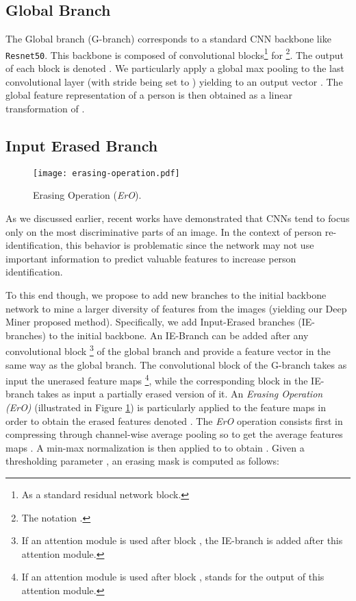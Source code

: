 \documentclass[final]{cvpr}
\begin{document}
\subsection{Global Branch}
The Global branch (G-branch) corresponds to a standard CNN backbone like \texttt{Resnet50}. This backbone is composed of  convolutional blocks\footnote{As a standard residual network block.}  for \footnote{The notation .}. The output of each block is denoted . We particularly apply a global max pooling to the last convolutional layer (with stride being set to ) yielding to an output vector . The global feature representation of a person is then obtained as a linear transformation of .


\subsection{Input Erased Branch}
\label{ss:ie_branch}
\begin{figure}[t!]
  \centering
  \texttt{[image: erasing-operation.pdf]}
\caption{Erasing Operation (\textit{ErO}).}
\label{fig:seo}
\end{figure}
As we discussed earlier, recent works \cite{chen2019hybrid, chen2019energy,tamaazousti2019universal} have  demonstrated that CNNs tend to focus only on the most discriminative parts of an image. In the context of person re-identification, this behavior is problematic since the network may not use important information to predict valuable features to increase person identification. 

To this end though, we propose to add new branches to the initial backbone network to mine a larger diversity of features from the images (yielding our Deep Miner proposed method). Specifically, we add Input-Erased branches (IE-branches) to the initial backbone. An IE-Branch can be added after any convolutional block \footnote{If an attention module is used after block , the IE-branch is added after this attention module.} of the global branch and provide a feature vector in the same way as the global branch. The convolutional block  of the G-branch takes as input the unerased feature maps \footnote{If an attention module is used after block ,  stands for the output of this attention module.}, while the corresponding block in the IE-branch takes as input a partially erased version of it.  An \textit{Erasing Operation (ErO)} (illustrated in Figure \ref{fig:seo}) is particularly applied to the feature maps  in order to obtain the erased features denoted . The \textit{ErO} operation consists first in compressing  through channel-wise average pooling so to get the average features maps . A min-max normalization is then applied to  to obtain . Given a thresholding parameter , an erasing mask  is computed as follows:
\end{document}
